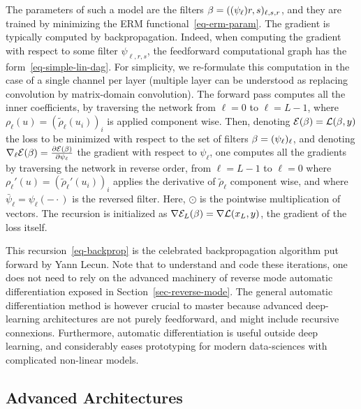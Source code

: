 The parameters of such a model are the filters $\beta = ( (\psi_\ell){r,s})_{\ell,s,r}$, and they are trained by minimizing the ERM functional~\eqref{eq-erm-param}. The gradient is typically computed by backpropagation. Indeed, when computing the gradient with respect to some filter $\psi_{\ell,r,s}$, the feedforward computational graph has the form~\eqref{eq-simple-lin-dag}. For simplicity, we re-formulate this computation in the case of a single channel per layer (multiple layer can be understood as replacing convolution by matrix-domain convolution). The forward pass computes all the inner coefficients, by traversing the network from $\ell=0$ to $\ell=L-1$, 
where $\rho_\ell(u)=(\tilde\rho_\ell(u_i))_i$ is applied component wise. Then, denoting $\mathcal{E}(\beta) = \mathcal{L}( \beta,y )$ the loss to be minimized with respect to the set of filters $\beta=(\psi_\ell)_\ell$, and denoting $\nabla_\ell \mathcal{E}(\beta) = \frac{ \partial \mathcal{E}( \beta )}{\partial \psi_\ell}$ the gradient with respect to $\psi_\ell$, one computes all the gradients by traversing the network in reverse order, from $\ell=L-1$ to $\ell=0$
where $\rho_\ell'(u)=( \tilde\rho_\ell'( u_i ) )_i$ applies the derivative of $\tilde\rho_\ell$ component wise, and where $\bar \psi_{\ell} = \psi_\ell(-\cdot)$ is the reversed filter. Here, $\odot$ is the pointwise multiplication of vectors.
%
The recursion is initialized as $\nabla \mathcal{E}_L(\beta) = \nabla \mathcal{L}(x_L,y)$, the gradient of the loss itself. 

This recursion~\eqref{eq-backprop} is the celebrated backpropagation algorithm put forward by Yann Lecun. Note that to understand and code these iterations, one does not need to rely on the advanced machinery of reverse mode automatic differentiation exposed in Section~\ref{sec-reverse-mode}. The general automatic differentiation method is however crucial to master because advanced deep-learning architectures are not purely feedforward, and might include recursive connexions. Furthermore, automatic differentiation is useful outside deep learning, and considerably eases prototyping for modern data-sciences with complicated non-linear models.  


\subsection{Advanced Architectures}
\label{sec-advanced}


